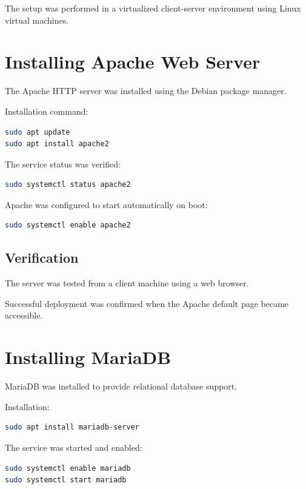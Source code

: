 \documentclass[11pt,a4paper]{article}
\begin{document}
The setup was performed in a virtualized client-server environment using Linux virtual machines.

\section{Installing Apache Web Server}

The Apache HTTP server was installed using the Debian package manager.

Installation command:

\begin{lstlisting}[language=bash]
sudo apt update
sudo apt install apache2
\end{lstlisting}

The service status was verified:

\begin{lstlisting}[language=bash]
sudo systemctl status apache2
\end{lstlisting}

Apache was configured to start automatically on boot:

\begin{lstlisting}[language=bash]
sudo systemctl enable apache2
\end{lstlisting}

\subsection{Verification}

The server was tested from a client machine using a web browser.

Successful deployment was confirmed when the Apache default page became accessible.

\section{Installing MariaDB}

MariaDB was installed to provide relational database support.

Installation:

\begin{lstlisting}[language=bash]
sudo apt install mariadb-server
\end{lstlisting}

The service was started and enabled:

\begin{lstlisting}[language=bash]
sudo systemctl enable mariadb
sudo systemctl start mariadb
\end{lstlisting}
\end{document}
